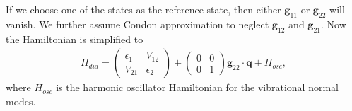 If we choose one of the states as the reference state, then either $\mathbf g_{11}$ or $\mathbf g_{22}$ will vanish. We further assume Condon approximation to neglect $\mathbf g_{12}$ and $\mathbf g_{21}$. Now the Hamiltonian is simplified to
\begin{eqnarray}
H_{dia}=\left(\begin{array}{cc}
\epsilon_{1} & V_{12}\\
V_{21} & \epsilon_{2}
\end{array}\right)+\left(\begin{array}{cc}
0 & 0\\
0 & 1
\end{array}\right) {\mathbf g}_{22}\cdot{\mathbf q}+H_{osc},
\end{eqnarray}
\label{eq:diaHam}
where $H_{osc}$ is the harmonic oscillator Hamiltonian for the vibrational normal modes.



